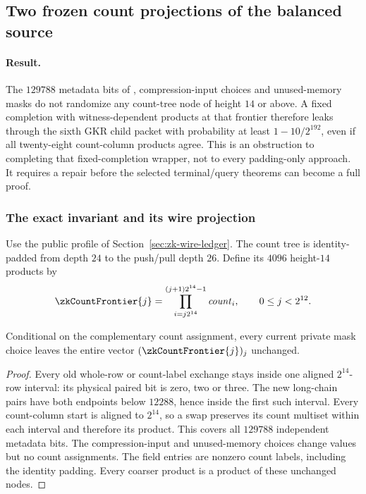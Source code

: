 \subsection{Two frozen count projections of the balanced source}\label{note:zk-count-frontier}

\paragraph{Result.} The $129788$ metadata bits of , compression-input choices and unused-memory masks do not randomize any count-tree node of height $14$ or above. A fixed completion with witness-dependent products at that frontier therefore leaks through the sixth GKR child packet with probability at least $1-10/2^{192}$, even if all twenty-eight count-column products agree. This is an obstruction to completing that fixed-completion wrapper, not to every padding-only approach. It requires a repair before the selected terminal/query theorems can become a full proof.

\subsubsection{The exact invariant and its wire projection}

Use the public profile of Section~\ref{sec:zk-wire-ledger}. The count tree is identity-padded from depth $24$ to the push/pull depth $26$. Define its $4096$ height-$14$ products by
\[
 \zkCountFrontier{j}=\prod_{i=j2^{14}}^{(j+1)2^{14}-1}\cnt_i,
 \qquad 0\le j<2^{12}.
\]

\begin{lemma}\label{lem:zk-frozen-count-frontier}
Conditional on the complementary count assignment, every current private mask choice leaves the entire vector $(\zkCountFrontier{j})_j$ unchanged.
\end{lemma}
\begin{proof}
Every old whole-row or count-label exchange stays inside one aligned $2^{14}$-row interval: its physical paired bit is zero, two or three. The new long-chain pairs have both endpoints below $12288$, hence inside the first such interval. Every count-column start is aligned to $2^{14}$, so a swap preserves its count multiset within each interval and therefore its product. This covers all $129788$ independent metadata bits. The compression-input and unused-memory choices change values but no count assignments. The field entries are nonzero count labels, including the identity padding. Every coarser product is a product of these unchanged nodes.
\end{proof}

